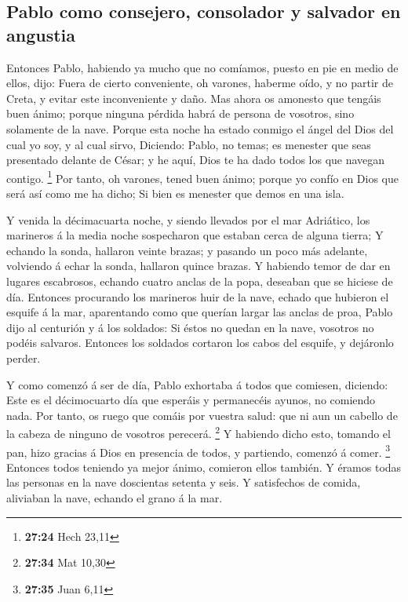 \hypertarget{pablo-como-consejero-consolador-y-salvador-en-angustia}{%
\subsection{Pablo como consejero, consolador y salvador en
angustia}\label{pablo-como-consejero-consolador-y-salvador-en-angustia}}

 Entonces Pablo, habiendo ya mucho que no comíamos, puesto
en pie en medio de ellos, dijo: Fuera de cierto conveniente, oh varones,
haberme oído, y no partir de Creta, y evitar este inconveniente y daño.
 Mas ahora os amonesto que tengáis buen ánimo; porque
ninguna pérdida habrá de persona de vosotros, sino solamente de la nave.
 Porque esta noche ha estado conmigo el ángel del Dios del
cual yo soy, y al cual sirvo,  Diciendo: Pablo, no temas;
es menester que seas presentado delante de César; y he aquí, Dios te ha
dado todos los que navegan contigo. \footnote{\textbf{27:24} Hech 23,11}
 Por tanto, oh varones, tened buen ánimo; porque yo confío
en Dios que será así como me ha dicho;  Si bien es menester
que demos en una isla.

 Y venida la décimacuarta noche, y siendo llevados por el
mar Adriático, los marineros á la media noche sospecharon que estaban
cerca de alguna tierra;  Y echando la sonda, hallaron
veinte brazas; y pasando un poco más adelante, volviendo á echar la
sonda, hallaron quince brazas.  Y habiendo temor de dar en
lugares escabrosos, echando cuatro anclas de la popa, deseaban que se
hiciese de día.  Entonces procurando los marineros huir de
la nave, echado que hubieron el esquife á la mar, aparentando como que
querían largar las anclas de proa,  Pablo dijo al centurión
y á los soldados: Si éstos no quedan en la nave, vosotros no podéis
salvaros.  Entonces los soldados cortaron los cabos del
esquife, y dejáronlo perder.

 Y como comenzó á ser de día, Pablo exhortaba á todos que
comiesen, diciendo: Este es el décimocuarto día que esperáis y
permanecéis ayunos, no comiendo nada.  Por tanto, os ruego
que comáis por vuestra salud: que ni aun un cabello de la cabeza de
ninguno de vosotros perecerá. \footnote{\textbf{27:34} Mat 10,30}
 Y habiendo dicho esto, tomando el pan, hizo gracias á Dios
en presencia de todos, y partiendo, comenzó á comer. \footnote{\textbf{27:35}
  Juan 6,11}  Entonces todos teniendo ya mejor ánimo,
comieron ellos también.  Y éramos todas las personas en la
nave doscientas setenta y seis.  Y satisfechos de comida,
aliviaban la nave, echando el grano á la mar.

